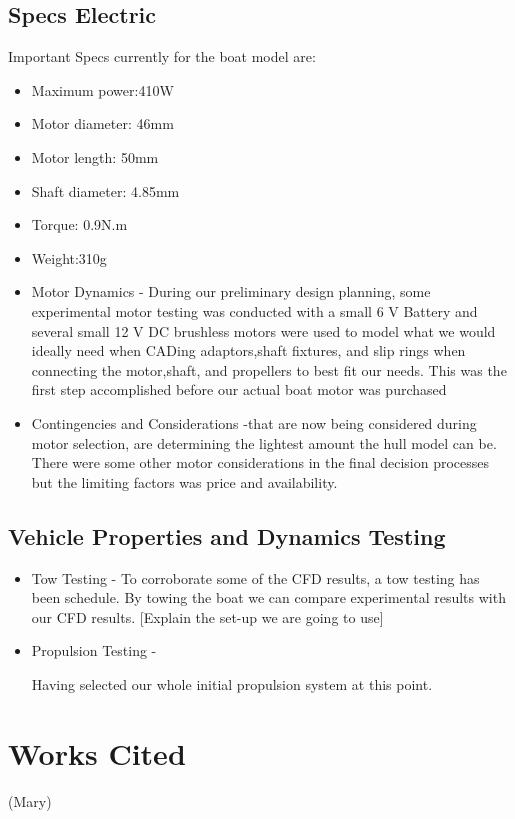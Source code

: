 \documentclass[12pt]{article}
\begin{document}
\pagebreak

\subsection{Specs Electric}
Important Specs currently for the boat model are:
\begin{itemize}
    \item Maximum power:410W
    \item Motor diameter: 46mm
    \item Motor length: 50mm
    \item Shaft diameter: 4.85mm
    \item Torque: 0.9N.m
    \item Weight:310g
    \item Motor Dynamics - During our preliminary design planning, some experimental motor testing was conducted with a small 6 V Battery and several small 12 V DC brushless motors were used to model what we would ideally need when CADing adaptors,shaft fixtures, and slip rings when connecting the motor,shaft, and propellers to best fit our needs. This was the first step accomplished before our actual boat motor was purchased
\end{itemize}



\begin{itemize}
    \item Contingencies and Considerations
-that are now being considered during motor selection, are determining the lightest amount the hull model can be.     
There were some other motor considerations in the final decision processes but the limiting factors was price and availability.
\end{itemize} 

\subsection{Vehicle Properties and Dynamics Testing}

\begin{itemize}
    \item Tow Testing - To corroborate some of the CFD results, a tow testing has been schedule. By towing the boat we can compare experimental results with our CFD results. [Explain the set-up we are going to use]
    
    \item Propulsion Testing - 
    
Having selected our whole initial propulsion system at this point.

    \end{itemize}


\section{Works Cited} (Mary)
\pagebreak
\end{document}
